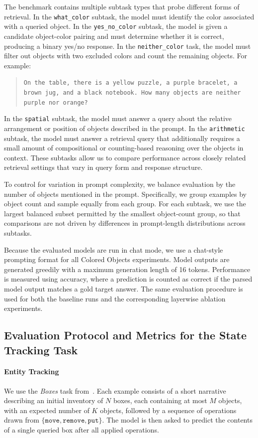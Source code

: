\documentclass{article}
\begin{document}
The benchmark contains multiple subtask types that probe different forms of retrieval. 
In the \texttt{what\_color} subtask, the model must identify the color associated with a queried object. 
In the \texttt{yes\_no\_color} subtask, the model is given a candidate object-color pairing and must determine whether it is correct, 
producing a binary yes/no response. 
In the \texttt{neither\_color} task, the model must filter out objects with two excluded colors and count the remaining objects. For example:
\begin{quote}
\small
\texttt{On the table, there is a yellow puzzle, a purple bracelet, a brown jug, and a black notebook. How many objects are neither purple nor orange?}
\end{quote}
In the \texttt{spatial} subtask, the model must answer a query about the relative arrangement or position of objects described in the prompt. 
In the \texttt{arithmetic} subtask, the model must answer a retrieval query that additionally requires a small amount of compositional or counting-based reasoning over the objects in context. 
These subtasks allow us to compare performance across closely related retrieval settings that vary in query form and response structure.





To control for variation in prompt complexity, we balance evaluation by the number of objects mentioned in the prompt. Specifically, we group examples by object count and sample equally from each group. 
For each subtask, we use the largest balanced subset permitted by the smallest object-count group, 
so that comparisons are not driven by differences in prompt-length distributions across subtasks.

Because the evaluated models are run in chat mode, we use a chat-style prompting format for all Colored Objects experiments. Model outputs are generated greedily with a maximum generation length of 16 tokens. 
Performance is measured using accuracy, where a prediction is counted as correct if the parsed model output matches a gold target answer.
The same evaluation procedure is used for both the baseline runs and the corresponding layerwise ablation experiments.


\subsection{Evaluation Protocol and Metrics for the State Tracking Task}

\paragraph{Entity Tracking} We use the \emph{Boxes} task from~\cite{kim-schuster-2023-entity}. Each example consists of a short narrative describing an initial inventory of $N$ boxes, each containing at most $M$ objects, with an expected number of $K$ objects, followed by a sequence of operations drawn from $\{\texttt{move}, \texttt{remove}, \texttt{put}\}$. The model is then asked to predict the contents of a single queried box after all applied operations.
\end{document}
